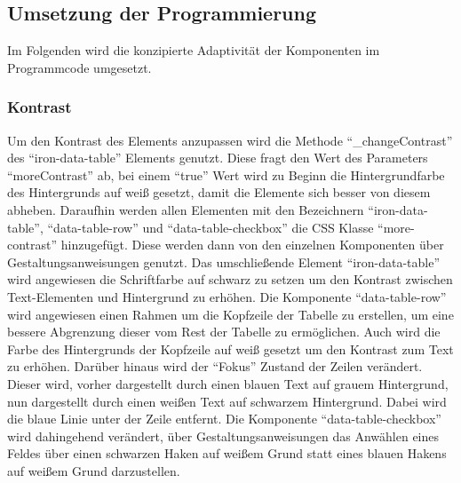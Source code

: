 \documentclass[12pt, paper=a4, bibtotoc, toc=listof, headsepline=true]{scrreprt}
\begin{document}
	\subsection{Umsetzung der Programmierung}
	Im Folgenden wird die konzipierte Adaptivität der Komponenten im Programmcode umgesetzt.
	\subsubsection{Kontrast}
	Um den Kontrast des Elements anzupassen wird die Methode \enquote{\_changeContrast} des \enquote{iron-data-table} Elements genutzt. Diese fragt den Wert des Parameters \enquote{moreContrast} ab, bei einem \enquote{true} Wert wird zu Beginn die Hintergrundfarbe des Hintergrunds auf weiß gesetzt, damit die Elemente sich besser von diesem abheben. Daraufhin werden allen Elementen mit den Bezeichnern \enquote{iron-data-table}, \enquote{data-table-row} und \enquote{data-table-checkbox} die CSS Klasse \enquote{more-contrast} hinzugefügt. Diese werden dann von den einzelnen Komponenten über Gestaltungsanweisungen genutzt. Das umschließende Element \enquote{iron-data-table} wird angewiesen die Schriftfarbe auf schwarz zu setzen um den Kontrast zwischen Text-Elementen und Hintergrund zu erhöhen. Die Komponente \enquote{data-table-row} wird angewiesen einen Rahmen um die Kopfzeile der Tabelle zu erstellen, um eine bessere Abgrenzung dieser vom Rest der Tabelle zu ermöglichen. Auch wird die Farbe des Hintergrunds der Kopfzeile auf weiß gesetzt um den Kontrast zum Text zu erhöhen. Darüber hinaus wird der \enquote{Fokus} Zustand der Zeilen verändert. Dieser wird, vorher dargestellt durch einen blauen Text auf grauem Hintergrund, nun dargestellt durch einen weißen Text auf schwarzem Hintergrund. Dabei wird die blaue Linie unter der Zeile entfernt. Die Komponente \enquote{data-table-checkbox} wird dahingehend verändert, über Gestaltungsanweisungen das Anwählen eines Feldes über einen schwarzen Haken auf weißem Grund statt eines blauen Hakens auf weißem Grund darzustellen.
\end{document}
